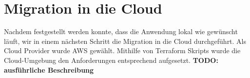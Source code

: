 

\section{Migration in die Cloud}
Nachdem festgestellt werden konnte, dass die Anwendung lokal wie gewünscht läuft, wir in einem nächsten Schritt die Migration in die Cloud durchgeführt. Als Cloud Provider wurde \ac{AWS} gewählt. Mithilfe von \gls{Terraform} Skripts wurde die Cloud-Umgebung den Anforderungen entsprechend aufgesetzt. \textbf{TODO: ausführliche Beschreibung}
\pagebreak